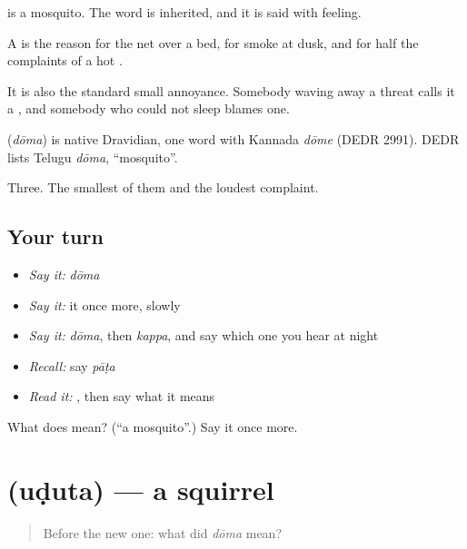  is a mosquito. The word is inherited, and it is said with feeling.

A  is the reason for the net over a bed, for smoke at dusk, and for half the complaints of a hot .

It is also the standard small annoyance. Somebody waving away a threat calls it a , and somebody who could not sleep blames one.

\begin{cousinweb}
\textbf{} (\emph{dōma}) is native Dravidian, one word with Kannada \emph{dōme} (DEDR 2991). DEDR lists Telugu \emph{dōma}, \textquotedblleft{}mosquito\textquotedblright{}.
\end{cousinweb}

\begin{grammarlens}[title={What you've built}]
Three. The smallest of them and the loudest complaint.
\end{grammarlens}

\subsection*{Your turn}
\begin{itemize}
\raggedright
  \item \emph{Say it:} \emph{dōma}
  \item \emph{Say it:} it once more, slowly
  \item \emph{Say it:} \emph{dōma}, then \emph{kappa}, and say which one you hear at night
  \item \emph{Recall:} say \emph{pāṭa}
  \item \emph{Read it:} \textbf{}, then say what it means
\end{itemize}

\begin{tcolorbox}[breakable,colback=teal!4,colframe=teal!35!black,title={Before you move on}]
What does  mean? (\textquotedblleft{}a mosquito\textquotedblright{}.) Say it once more.
\end{tcolorbox}
\section[\texorpdfstring{\te{ఉడుత} (uḍuta)}{ఉడుత (uḍuta)}]{ (uḍuta) — a squirrel}

\label{lesson:TE-C70-squirrel}



\begin{quote}
Before the new one: what did \emph{dōma} mean?
\end{quote}

